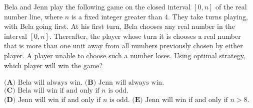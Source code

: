 Bela and Jenn play the following game on the closed interval $[0, n]$ of the real number line, where $n$ is a fixed integer greater than $4$. They take turns playing, with Bela going first. At his first turn, Bela chooses any real number in the interval $[0, n]$. Thereafter, the player whose turn it is chooses a real number that is more than one unit away from all numbers previously chosen by either player. A player unable to choose such a number loses. Using optimal strategy, which player will win the game?

$\textbf{(A) } \text{Bela will always win.}$
$\textbf{(B) } \text{Jenn will always win.} $
$\textbf{(C) } \text{Bela will win if and only if }n \text{ is odd.}$
$\textbf{(D) } \text{Jenn will win if and only if }n \text{ is odd.} $
$\textbf{(E) } \text{Jenn will win if and only if }n > 8.$